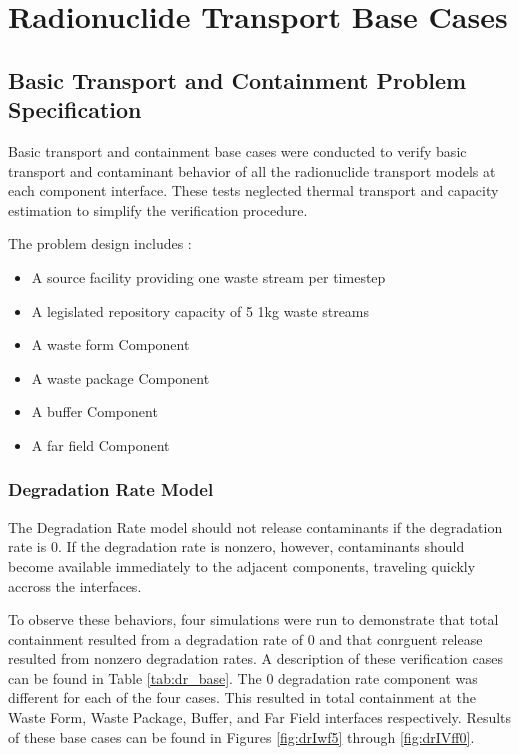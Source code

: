 \section{Radionuclide Transport Base Cases}\label{sec:nuclide_base_cases}
\subsection{Basic Transport and Containment Problem Specification}
Basic transport and containment base cases were conducted to verify basic 
transport and contaminant behavior of all the radionuclide transport models at 
each component interface. These tests neglected thermal transport and capacity 
estimation to simplify the verification procedure.  

The problem design includes : 
\begin{itemize}
\item{A source facility providing one waste stream per timestep}
\item{A legislated repository capacity of 5 1kg waste streams}
\item{A waste form Component} 
\item{A waste package Component}
\item{A buffer Component}
\item{A far field Component}
\end{itemize}

\subsubsection{Degradation Rate Model}
The Degradation Rate model should not release contaminants if the degradation 
rate is 0. If the degradation rate is nonzero, however, contaminants should 
become available immediately to the adjacent components, traveling quickly 
accross the interfaces. 

To observe these behaviors, four simulations were run to demonstrate that total 
containment resulted from a degradation rate of 0 and that conrguent release 
resulted from nonzero degradation rates. A description of these verification 
cases can be found in Table \ref{tab:dr_base}. The 0 degradation rate component was 
different for each of the four cases. This resulted in total containment at the 
Waste Form, Waste Package, Buffer, and Far Field interfaces respectively. 
Results of these base cases can be found in Figures 
\ref{fig:drIwf5} through \ref{fig:drIVff0}.



\clearpage

